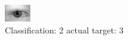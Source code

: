 \begin{figure}[h!]
\begin{center}
\includegraphics[width=0.60\columnwidth]{figures/ID550_class_2_target_3.png}
\end{center}
\caption{ Classification: 2 actual target: 3}
\label{fig:ID550_class_2_target_3}
\end{figure}
